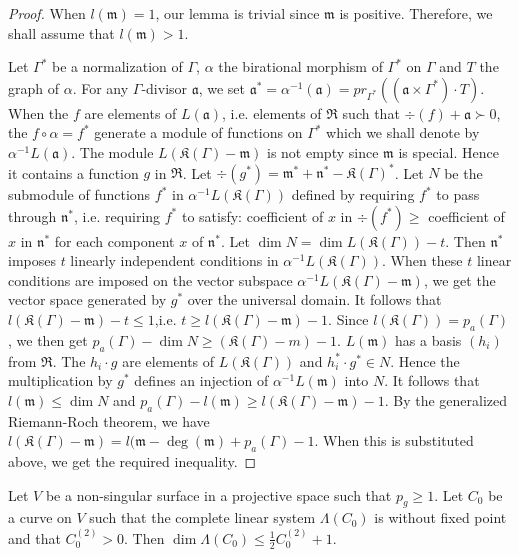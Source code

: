 \begin{proof}
When $l(\mathfrak{m})=1$, our lemma is trivial since $\mathfrak{m}$ is positive. Therefore, we shall assume that $l(\mathfrak{m})>1$.

Let $\Gamma^{*}$ be a normalization of $\Gamma$, $\alpha$ the birational morphism of $\Gamma^{*}$ on $\Gamma$ and $T$ the graph of $\alpha$. For any $\Gamma$-divisor $\mathfrak{a}$, we set $\mathfrak{a}^{*}=\alpha^{-1}(\mathfrak{a})=pr_{\Gamma^{*}}((\mathfrak{a}\times \Gamma^{*})\cdot T)$. When the $f$ are elements of $L(\mathfrak{a})$, i.e. elements of $\mathfrak{R}$ such that $\div (f)+\mathfrak{a}\succ 0$, the $f\circ \alpha=f^{*}$ generate a module of functions on $\Gamma^{*}$ which we shall denote by $\alpha^{-1}L(\mathfrak{a})$. The module $L(\mathfrak{K}(\Gamma)-\mathfrak{m})$ is not empty since $\mathfrak{m}$ is special. Hence it contains a function $g$ in $\mathfrak{R}$. Let $\div(g^{*})=\mathfrak{m}^{*}+\mathfrak{n}^{*}-\mathfrak{K}(\Gamma)^{*}$. Let $N$ be the submodule of functions $f^{*}$ in $\alpha^{-1}L(\mathfrak{K}(\Gamma))$ defined by requiring $f^{*}$ to pass through $\mathfrak{n}^{*}$, i.e. requiring $f^{*}$ to satisfy: coefficient of $x$ in $\div (f^{*})\geq $ coefficient of $x$ in $\mathfrak{n}^{*}$ for each component $x$ of $\mathfrak{n}^{*}$. Let $\dim N=\dim L(\mathfrak{K}(\Gamma))-t$. Then $\mathfrak{n}^{*}$ imposes $t$ linearly independent conditions in $\alpha^{-1}L(\mathfrak{K}(\Gamma))$. When these $t$ linear conditions are imposed on the vector subspace $\alpha^{-1}L(\mathfrak{K}(\Gamma)-\mathfrak{m})$, we get the vector space generated by $g^{*}$ over the universal domain. It follows that $l(\mathfrak{K}(\Gamma)-\mathfrak{m})-t\leq 1$,\pageoriginale i.e. $t\geq l(\mathfrak{K}(\Gamma)-\mathfrak{m})-1$. Since $l(\mathfrak{K}(\Gamma))=p_{a}(\Gamma)$, we then get $p_{a}(\Gamma)-\dim N\geq (\mathfrak{K}(\Gamma)-m)-1$. $L(\mathfrak{m})$ has a basis $(h_{i})$ from $\mathfrak{R}$. The $h_{i}\cdot g$ are elements of $L(\mathfrak{K}(\Gamma))$ and $h_{i}^{*}\cdot g^{*}\in N$. Hence the multiplication by $g^{*}$ defines an injection of $\alpha^{-1}L(\mathfrak{m})$ into $N$. It follows that $l(\mathfrak{m})\leq \dim N$ and $p_{a}(\Gamma)-l(\mathfrak{m})\geq l(\mathfrak{K}(\Gamma)-\mathfrak{m})-1$. By the generalized Riemann-Roch theorem, we have $l(\mathfrak{K}(\Gamma)-\mathfrak{m})=l(\mathfrak{m}-\deg (\mathfrak{m})+p_{a}(\Gamma)-1$. When this is substituted above, we get the required inequality.
\end{proof}

\begin{proposition}\label{art14-prop2}
Let $V$ be a non-singular surface in a projective space such that $p_{g}\geq 1$. Let $C_{0}$ be a curve on $V$ such that the complete linear system $\Lambda (C_{0})$ is without fixed point and that $C^{(2)}_{0}>0$. Then $\dim \Lambda (C_{0})\leq \frac{1}{2}C^{(2)}_{0}+1$.
\end{proposition}


